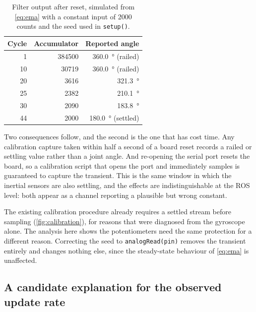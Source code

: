\begin{table}[htbp]
  \centering
  \caption{Filter output after reset, simulated from \cref{eq:ema} with a
  constant input of \num{2000} counts and the seed used in \texttt{setup()}.}
  \label{tab:transient}
  \begin{tabular}{@{}rrr@{}}
    \toprule
    Cycle & Accumulator & Reported angle \\
    \midrule
     1 & \num{384500} & \SI{360.0}{\degree} (railed) \\
    10 & \num{30719}  & \SI{360.0}{\degree} (railed) \\
    20 & \num{3616}   & \SI{321.3}{\degree} \\
    25 & \num{2382}   & \SI{210.1}{\degree} \\
    30 & \num{2090}   & \SI{183.8}{\degree} \\
    44 & \num{2000}   & \SI{180.0}{\degree} (settled) \\
    \bottomrule
  \end{tabular}
\end{table}

Two consequences follow, and the second is the one that has cost time. Any
calibration capture taken within half a second of a board reset records a
railed or settling value rather than a joint angle. And re-opening the serial
port resets the board, so a calibration script that opens the port and
immediately samples is guaranteed to capture the transient. This is the same
window in which the inertial sensors are also settling, and the effects are
indistinguishable at the ROS level: both appear as a channel reporting a
plausible but wrong constant.

The existing calibration procedure already requires a settled stream before
sampling (\cref{fig:calibration}), for reasons that were diagnosed from the
gyroscope alone. The analysis here shows the potentiometers need the same
protection for a different reason. Correcting the seed to
\texttt{analogRead(pin)} removes the transient entirely and changes nothing
else, since the steady-state behaviour of \cref{eq:ema} is unaffected.

\subsection{A candidate explanation for the observed update rate}

